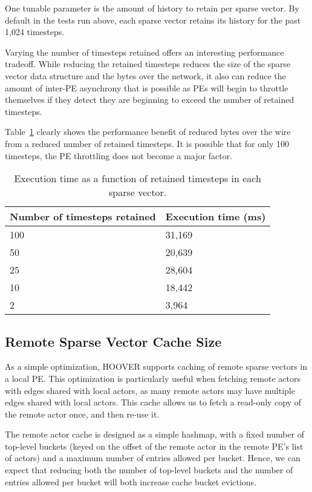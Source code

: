 One tunable parameter is the amount of history to retain per sparse vector. By
default in the tests run above, each sparse vector retains its history for the
past 1,024 timesteps.

Varying the number of timesteps retained offers an interesting performance
tradeoff. While reducing the retained timesteps reduces the size of the sparse
vector data structure and the bytes over the network, it also can reduce the amount
of inter-PE asynchrony that is possible as PEs will begin to throttle themselves
if they detect they are beginning to exceed the number of retained timesteps.

Table~\ref{tab:timesteps_retained} clearly shows the performance benefit of
reduced bytes over the wire from a reduced number of retained timesteps. It is
possible that for only 100 timesteps, the PE throttling does not become a major
factor.

\begin{table}
\centering
\begin{tabularx}{\textwidth}{ | X | X | }
\hline
Number of timesteps retained & Execution time (ms) \\\hline
100 & 31,169 \\\hline
50  & 20,639 \\\hline
25  & 28,604 \\\hline
10  & 18,442 \\\hline
2   & 3,964 \\\hline
\end{tabularx}
\caption{Execution time as a function of retained timesteps in each sparse vector.}
\label{tab:timesteps_retained}
\end{table}

\subsection{Remote Sparse Vector Cache Size}

As a simple optimization, HOOVER supports caching of remote sparse vectors in a
local PE. This optimization is particularly useful when fetching remote actors
with edges shared with local actors, as many remote actors may have multiple
edges shared with local actors. This cache allows us to fetch a read-only copy
of the remote actor once, and then re-use it.

The remote actor cache is designed as a simple hashmap, with a fixed number of
top-level buckets (keyed on the offset of the remote actor in the remote PE's
list of actors) and a maximum number of entries allowed per bucket. Hence, we
can expect that reducing both the number of top-level buckets and the number of
entries allowed per bucket will both increase cache bucket evictions.

